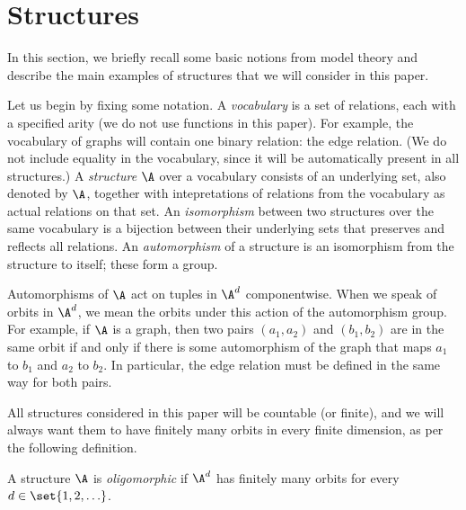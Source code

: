 \section{Structures}\label{sec:structures}

In this section, we briefly recall some basic notions from model theory and describe the main examples of structures that we will consider in this paper.

Let us begin by fixing some notation.
A \emph{vocabulary} is a set of relations, each with a specified arity (we do not use functions in this paper). For example, the vocabulary of graphs will contain one binary relation: the edge relation. (We do not include equality in the vocabulary, since it will be automatically present in all structures.) A \emph{structure} $\A$ over a vocabulary consists of an underlying set, also denoted by $\A$, together with intepretations of relations from the vocabulary as actual relations on that set. An \emph{isomorphism} between two structures over the same vocabulary is a bijection between their underlying sets that preserves and reflects all relations. An \emph{automorphism} of a structure is an isomorphism from the structure to itself; these form a group. 

Automorphisms  of $\A$ act on  tuples in $\A^d$ componentwise.  When we speak of orbits in $\A^d$, we mean the orbits under this action of the automorphism group. For example, if $\A$ is a graph, then two pairs $(a_1,a_2)$ and $(b_1,b_2)$ are in the same orbit if and only if there is some automorphism of the graph that maps $a_1$ to $b_1$ and $a_2$ to $b_2$. In particular, the edge relation must be defined in the same way for both pairs.

All structures considered in this paper will be countable (or finite), and we will always want them to have finitely many orbits in every finite dimension, as per the following definition.

\begin{definition}\label{def:oligomorphic-structure}
    A structure $\A$ is \emph{oligomorphic} if $\A^d$ has finitely many orbits  for every $d \in \set{1,2,\ldots}$.
\end{definition}

